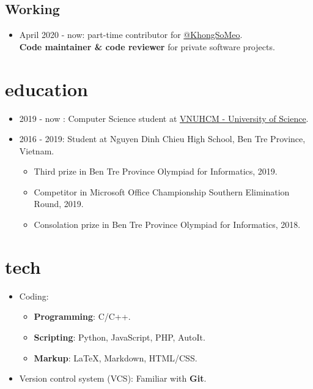 \documentclass{article}
\begin{document}
\subsection{Working}
\begin{itemize}
\item April 2020 - now: part-time contributor for \href{https://github.com/khongsomeo}{@KhongSoMeo}.\\
\textbf{Code maintainer \& code reviewer} for private software projects.
\end{itemize}

\section{education}
\begin{itemize}
\item 2019 - now : Computer Science student at \href{https://en.hcmus.edu.vn}{VNUHCM - University of Science}.
\item 2016 - 2019: Student at Nguyen Dinh Chieu High School, Ben Tre Province, Vietnam.
\begin{itemize}
\item Third prize in Ben Tre Province Olympiad for Informatics, 2019.
\item Competitor in Microsoft Office Championship Southern Elimination Round, 2019.
\item Consolation prize in Ben Tre Province Olympiad for Informatics, 2018.
\end{itemize}
\end{itemize}

\section{tech}
\begin{itemize}
\item Coding:
\begin{itemize}
\item \textbf{Programming}: C/C++.
\item \textbf{Scripting}: Python, JavaScript, PHP, AutoIt.
\item \textbf{Markup}: \LaTeX, Markdown, HTML/CSS.
\end{itemize}
\item Version control system (VCS):
Familiar with \textbf{Git}.
\end{itemize}
\end{document}
